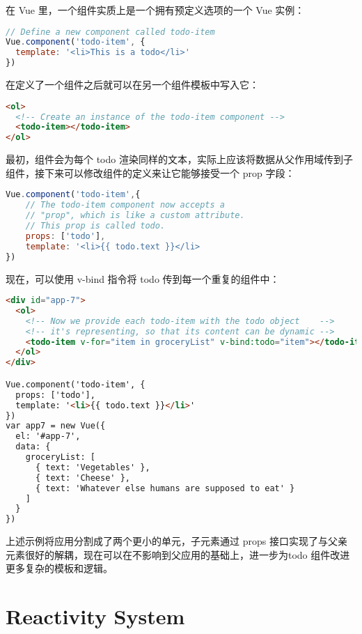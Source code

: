 在 Vue 里，一个组件实质上是一个拥有预定义选项的一个 Vue 实例：


\begin{lstlisting}[language=JavaScript]
// Define a new component called todo-item
Vue.component('todo-item', {
  template: '<li>This is a todo</li>'
})
\end{lstlisting}

在定义了一个组件之后就可以在另一个组件模板中写入它：

\begin{lstlisting}[language=HTML]
<ol>
  <!-- Create an instance of the todo-item component -->
  <todo-item></todo-item>
</ol>
\end{lstlisting}

最初，组件会为每个 todo 渲染同样的文本，实际上应该将数据从父作用域传到子组件，接下来可以修改组件的定义来让它能够接受一个 prop 字段：


\begin{lstlisting}[language=JavaScript]
Vue.component('todo-item',{
    // The todo-item component now accepts a
    // "prop", which is like a custom attribute.
    // This prop is called todo.
    props: ['todo'],
    template: '<li>{{ todo.text }}</li>
})
\end{lstlisting}

现在，可以使用 v-bind 指令将 todo 传到每一个重复的组件中：



\begin{lstlisting}[language=HTML]
<div id="app-7">
  <ol>
    <!-- Now we provide each todo-item with the todo object    -->
    <!-- it's representing, so that its content can be dynamic -->
    <todo-item v-for="item in groceryList" v-bind:todo="item"></todo-item>
  </ol>
</div>

Vue.component('todo-item', {
  props: ['todo'],
  template: '<li>{{ todo.text }}</li>'
})
var app7 = new Vue({
  el: '#app-7',
  data: {
    groceryList: [
      { text: 'Vegetables' },
      { text: 'Cheese' },
      { text: 'Whatever else humans are supposed to eat' }
    ]
  }
})
\end{lstlisting}


上述示例将应用分割成了两个更小的单元，子元素通过 props 接口实现了与父亲元素很好的解耦，现在可以在不影响到父应用的基础上，进一步为todo 组件改进更多复杂的模板和逻辑。


\section{Reactivity System}

